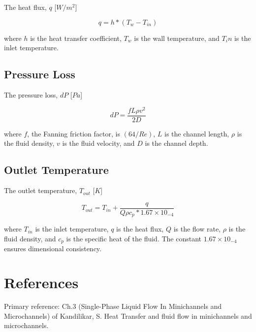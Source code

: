 \documentclass{article}
\begin{document}
The heat flux, $q$ [$W/m^2$]

\begin{equation}
	q = h * (T_w - T_{in})
\end{equation}

where $h$ is the heat transfer coefficient, $T_w$ is the wall temperature, and $T_in$ is the inlet temperature.

\subsection{Pressure Loss}

The pressure loss, $dP$ [$Pa$]

\begin{equation}
	dP = \frac{ f L \rho v^2 }{2D}
\end{equation}

where $f$, the Fanning friction factor, is $(64/Re)$, $L$ is the channel length, $\rho$ is the fluid density, $v$ is the fluid velocity, and $D$ is the channel depth.

\subsection{Outlet Temperature}

The outlet temperature, $T_{out}$ [$K$]

\begin{equation}
	T_{out} = T_{in} + \frac{q}{Q \rho c_p * 1.67 \times 10_{-4}}
\end{equation}

where $T_{in}$ is the inlet temperature, $q$ is the heat flux, $Q$ is the flow rate, $\rho$ is the fluid density, and $c_p$ is the specific heat of the fluid.  The constant $1.67 \times 10_{-4}$ ensures dimensional consistency.

\section{References}
Primary reference: Ch.3 (Single-Phase Liquid Flow In Minichannels and Microchannels) of Kandilikar, S. Heat Transfer and fluid flow in minichannels and microchannels.
\end{document}
